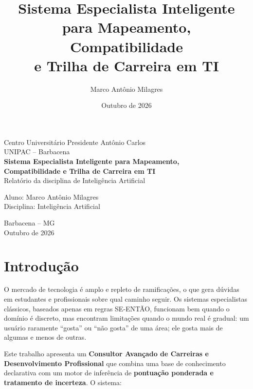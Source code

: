 \documentclass[12pt,a4paper]{article}
\title{Sistema Especialista Inteligente para Mapeamento, Compatibilidade\\e Trilha de Carreira em TI}
\author{Marco Ant\^onio Milagres}
\date{Outubro de 2026}
\begin{document}
\begin{titlepage}
    \centering
    {\large Centro Universit\'ario Presidente Ant\^onio Carlos}\\[0.2cm]
    {\large UNIPAC -- Barbacena}\\[3cm]

    {\Large\bfseries Sistema Especialista Inteligente para Mapeamento,\\ Compatibilidade e Trilha de Carreira em TI}\\[1cm]

    {\large Relat\'orio da disciplina de Intelig\^encia Artificial}\\[3cm]

    \begin{flushright}
        \begin{minipage}{0.5\textwidth}
            Aluno: Marco Ant\^onio Milagres\\
            Disciplina: Intelig\^encia Artificial
        \end{minipage}
    \end{flushright}

    \vfill
    {\large Barbacena -- MG}\\

    {\large Outubro de 2026}
\end{titlepage}

\tableofcontents
\newpage

\section{Introdu\c{c}\~ao}

O mercado de tecnologia \'e amplo e repleto de ramifica\c{c}\~oes, o que gera d\'uvidas
em estudantes e profissionais sobre qual caminho seguir. Os sistemas especialistas
cl\'assicos, baseados apenas em regras SE-ENT\~AO, funcionam bem quando o dom\'inio
\'e discreto, mas encontram limita\c{c}\~oes quando o mundo real \'e gradual: um
usu\'ario raramente ``gosta'' ou ``n\~ao gosta'' de uma \'area; ele gosta mais de
algumas e menos de outras.

Este trabalho apresenta um \textbf{Consultor Avan\c{c}ado de Carreiras e Desenvolvimento
Profissional} que combina uma base de conhecimento declarativa com um motor de
infer\^encia de \textbf{pontua\c{c}\~ao ponderada e tratamento de incerteza}. O
sistema:
\end{document}
